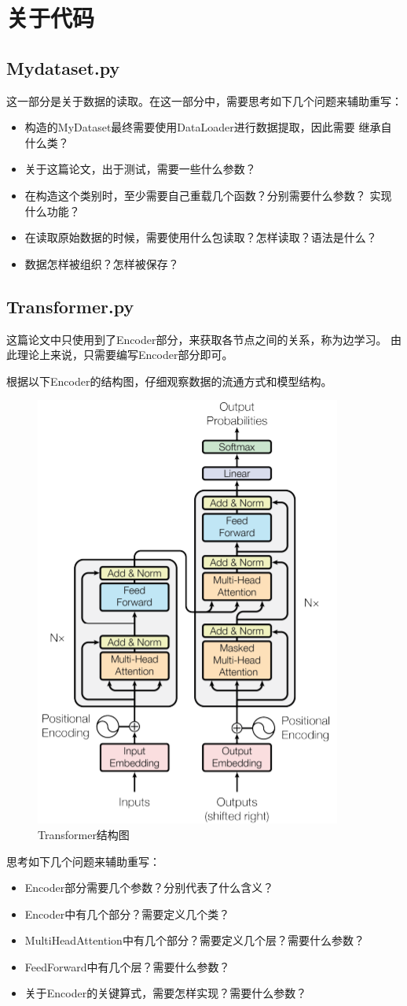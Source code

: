 \documentclass[AutoFakeBold]{MyFormat}
\begin{document}
\chapter{关于代码}
\section{Mydataset.py}
\par 这一部分是关于数据的读取。在这一部分中，需要思考如下几个问题来辅助重写：
\begin{itemize}
    \item 构造的MyDataset最终需要使用DataLoader进行数据提取，因此需要
    继承自什么类？
    \item 关于这篇论文，出于测试，需要一些什么参数？
    \item 在构造这个类别时，至少需要自己重载几个函数？分别需要什么参数？
    实现什么功能？
    \item 在读取原始数据的时候，需要使用什么包读取？怎样读取？语法是什么？
    \item 数据怎样被组织？怎样被保存？
\end{itemize}

\section{Transformer.py}
\par 这篇论文中只使用到了Encoder部分，来获取各节点之间的关系，称为边学习。
由此理论上来说，只需要编写Encoder部分即可。
\par 根据以下Encoder的结构图，仔细观察数据的流通方式和模型结构。
\begin{figure}[!h]
    \centering
    \includegraphics[width=0.4\linewidth]{figures/2022.06.05/Encoder.png}
    \caption{Transformer结构图}
\end{figure}
\par 思考如下几个问题来辅助重写：
\begin{itemize}
    \item Encoder部分需要几个参数？分别代表了什么含义？
    \item Encoder中有几个部分？需要定义几个类？
    \item MultiHeadAttention中有几个部分？需要定义几个层？需要什么参数？
    \item FeedForward中有几个层？需要什么参数？
    \item 关于Encoder的关键算式，需要怎样实现？需要什么参数？
\end{itemize}
\end{document}
